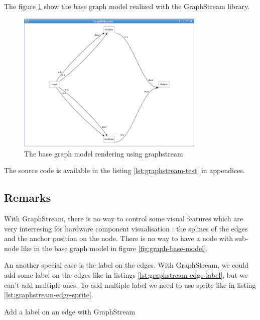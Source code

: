 The figure \ref{fig:base-graph-model-graphstream} show the base graph model realized with the GraphStream library.

\begin{figure}[h]
    \centering
    \includegraphics[width=0.8\textwidth]{img/graphstream-base-model-example}
    \caption{The base graph model rendering using graphstream}
    \label{fig:base-graph-model-graphstream}
\end{figure}

The source code is available in the listing \ref{lst:graphstream-test} in appendices.


\subsection{Remarks} %
\label{sub:Remarks}

With GraphStream, there is no way to control some visual features which are very interresing for hardware component visualisation : the splines of the edges and the anchor position on the node. There is no way to have a node with sub-node like in the base graph model in figure \ref{fig:graph-base-model}.

An another special case is the label on the edges. With GraphStream, we could add some label on the edges like in listings \ref{lst:graphstream-edge-label}, but we can't add multiple ones. To add multiple label we need to use sprite like in listing \ref{lst:graphstream-edge-sprite}.

\begin{listing}[h] %
    \centering
    \caption{Add a label on an edge with GraphStream}
    \label{lst:graphstream-edge-label}
\end{listing} %

